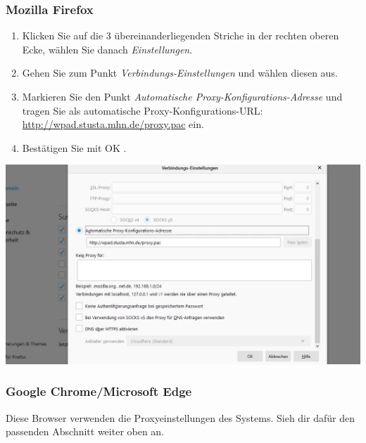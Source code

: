 \documentclass[a4paper,12pt]{scrartcl}
\begin{document}
\subsubsection*{Mozilla Firefox}

\begin{minipage}{0.57\textwidth}
\begin{enumerate}
	\item Klicken Sie auf die 3 übereinanderliegenden Striche in der rechten oberen Ecke, wählen Sie danach \emph{Einstellungen}.
	\item Gehen Sie zum Punkt \emph{Verbindungs-Einstellungen} und wählen diesen aus.
	\item Markieren Sie den Punkt \emph{Automatische Proxy-Konfigurations-Adresse} und tragen Sie als automatische Proxy-Konfigurations-URL: \\ \url{http://wpad.stusta.mhn.de/proxy.pac} ein.
	\item Bestätigen Sie mit OK .
\end{enumerate}
\end{minipage}
\hfill
\begin{minipage}{0.4\textwidth}
\centering
\includegraphics[width=\linewidth,keepaspectratio]{Bilder/Firefox_neu_proxy}
\end{minipage}


\subsubsection*{Google Chrome/Microsoft Edge}

Diese Browser verwenden die Proxyeinstellungen des Systems.
Sieh dir dafür den passenden Abschnitt weiter oben an.
\end{document}
